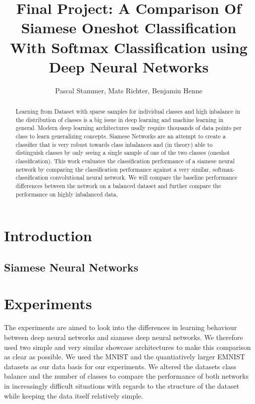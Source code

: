\documentclass[a4paper,pt12]{article}
\begin{document}
\author{Pascal Stammer, Mats Richter, Benjamin Henne}
\title{Final Project: A Comparison Of Siamese Oneshot Classification With Softmax Classification using Deep Neural Networks}


\maketitle

\begin{abstract}
Learning from Dataset with sparse samples for individual classes and high inbalance in the distribution of classes is a big issue in deep learning and machine learning in general. Modern deep learning architectures usally require thousands of data points per class to learn generalizing concepts. Siamese Networks are an attempt to create a classifier that is very robust towards class inbalances and (in theory) able to distinguish classes by only seeing a single sample of one of the two classes (oneshot classification). This work evaluates the classification performance of a siamese neural network by comparing the classification performance against a very similar, softmax-classification convolutional neural network. We will compare the baseline performance differences between the network on a balanced dataset and further compare the performance on highly inbalanced data. 

\end{abstract}

\section{Introduction}

\subsection{Siamese Neural Networks}

\section{Experiments}
The experiments are aimed to look into the differences in learning behaviour between deep neural networks and siamese deep neural networks. We therefore used two simple and very similar showcase  architectures to make this comparison as clear as possible. We used the MNIST and the quantiatively larger EMNIST datasets as our data basis for our experiments. We altered the datasets class balance and the number of classes to compare the performance of both networks in increasingly difficult situations with regards to the structure of the dataset while keeping the data itself relatively simple.  
\end{document}
